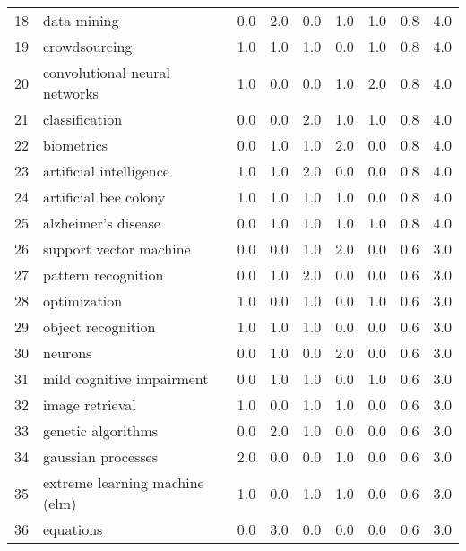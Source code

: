 \begin{tabular}{llrrrrrrr}
18 &                        data mining &   0.0 &   2.0 &   0.0 &   1.0 &   1.0 &   0.8 &    4.0 \\
19 &                      crowdsourcing &   1.0 &   1.0 &   1.0 &   0.0 &   1.0 &   0.8 &    4.0 \\
20 &      convolutional neural networks &   1.0 &   0.0 &   0.0 &   1.0 &   2.0 &   0.8 &    4.0 \\
21 &                     classification &   0.0 &   0.0 &   2.0 &   1.0 &   1.0 &   0.8 &    4.0 \\
22 &                         biometrics &   0.0 &   1.0 &   1.0 &   2.0 &   0.0 &   0.8 &    4.0 \\
23 &            artificial intelligence &   1.0 &   1.0 &   2.0 &   0.0 &   0.0 &   0.8 &    4.0 \\
24 &              artificial bee colony &   1.0 &   1.0 &   1.0 &   1.0 &   0.0 &   0.8 &    4.0 \\
25 &                alzheimer's disease &   0.0 &   1.0 &   1.0 &   1.0 &   1.0 &   0.8 &    4.0 \\
26 &             support vector machine &   0.0 &   0.0 &   1.0 &   2.0 &   0.0 &   0.6 &    3.0 \\
27 &                pattern recognition &   0.0 &   1.0 &   2.0 &   0.0 &   0.0 &   0.6 &    3.0 \\
28 &                       optimization &   1.0 &   0.0 &   1.0 &   0.0 &   1.0 &   0.6 &    3.0 \\
29 &                 object recognition &   1.0 &   1.0 &   1.0 &   0.0 &   0.0 &   0.6 &    3.0 \\
30 &                            neurons &   0.0 &   1.0 &   0.0 &   2.0 &   0.0 &   0.6 &    3.0 \\
31 &          mild cognitive impairment &   0.0 &   1.0 &   1.0 &   0.0 &   1.0 &   0.6 &    3.0 \\
32 &                    image retrieval &   1.0 &   0.0 &   1.0 &   1.0 &   0.0 &   0.6 &    3.0 \\
33 &                 genetic algorithms &   0.0 &   2.0 &   1.0 &   0.0 &   0.0 &   0.6 &    3.0 \\
34 &                 gaussian processes &   2.0 &   0.0 &   0.0 &   1.0 &   0.0 &   0.6 &    3.0 \\
35 &     extreme learning machine (elm) &   1.0 &   0.0 &   1.0 &   1.0 &   0.0 &   0.6 &    3.0 \\
36 &                          equations &   0.0 &   3.0 &   0.0 &   0.0 &   0.0 &   0.6 &    3.0 \\

\end{tabular}
